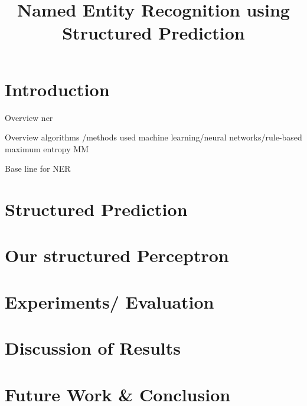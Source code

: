 \documentclass[a4paper,10pt]{article}
\title{Named Entity Recognition using Structured Prediction}
\author{}
\date{}
\begin{document}
\maketitle

\section{Introduction}

Overview ner

Overview algorithms /methods used 
machine learning/neural networks/rule-based 
maximum entropy MM

Base line for NER


\section{Structured Prediction}


\section{Our structured Perceptron}


\section{Experiments/ Evaluation}



\section{Discussion of Results}




\section{Future Work \& Conclusion}






{\small


}
\end{document}
